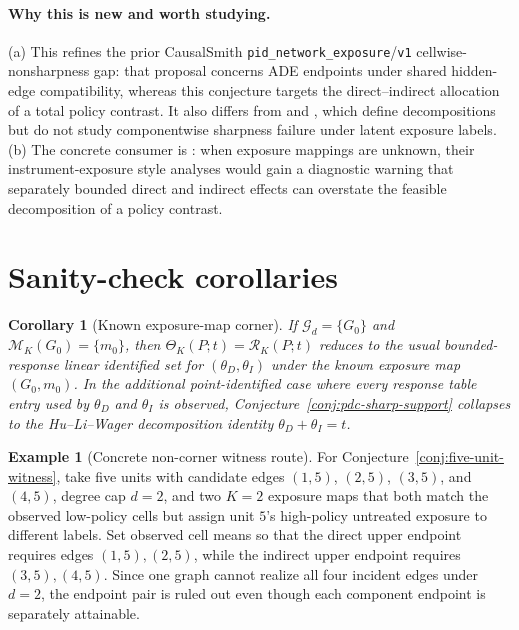 \documentclass[11pt]{article}
\theoremstyle{definition}
\newtheorem{example}{Example}
\theoremstyle{plain}
\newtheorem{corollary}{Corollary}
\theoremstyle{remark}
\begin{document}
\paragraph{Why this is new and worth studying.}
(a) This refines the prior CausalSmith \texttt{pid\_network\_exposure}/\texttt{v1}
cellwise-nonsharpness gap: that proposal concerns ADE endpoints under shared
hidden-edge compatibility, whereas this conjecture targets the direct--indirect
allocation of a total policy contrast.  It also differs from \citet{HudgensHalloran2008}
and \citet{HuLiWager2022}, which define decompositions but do not study
componentwise sharpness failure under latent exposure labels.  (b) The concrete
consumer is \citet{HoshinoYanagi2024}: when exposure mappings are unknown, their
instrument-exposure style analyses would gain a diagnostic warning that
separately bounded direct and indirect effects can overstate the feasible
decomposition of a policy contrast.

\section{Sanity-check corollaries}
\begin{corollary}[Known exposure-map corner]\label{cor:known-map}
If \(\mathcal G_d=\{G_0\}\) and \(\mathcal M_K(G_0)=\{m_0\}\), then
\(\Theta_K(P;t)=\mathcal R_K(P;t)\) reduces to the usual bounded-response linear identified
set for \((\theta_D,\theta_I)\) under the known exposure map \((G_0,m_0)\).  In
the additional point-identified case where every response table entry used by
\(\theta_D\) and \(\theta_I\) is observed, Conjecture~\ref{conj:pdc-sharp-support}
collapses to the Hu--Li--Wager decomposition identity
\(\theta_D+\theta_I=t\).
\end{corollary}

\begin{example}[Concrete non-corner witness route]\label{ex:five-unit-route}
For Conjecture~\ref{conj:five-unit-witness}, take five units with candidate
edges \((1,5)\), \((2,5)\), \((3,5)\), and \((4,5)\), degree cap \(d=2\), and
two \(K=2\) exposure maps that both match the observed low-policy cells but
assign unit \(5\)'s high-policy untreated exposure to different labels.  Set
observed cell means so that the direct upper endpoint requires edges
\((1,5),(2,5)\), while the indirect upper endpoint requires
\((3,5),(4,5)\).  Since one graph cannot realize all four incident edges under
\(d=2\), the endpoint pair is ruled out even though each component endpoint is
separately attainable.
\end{example}
\end{document}
